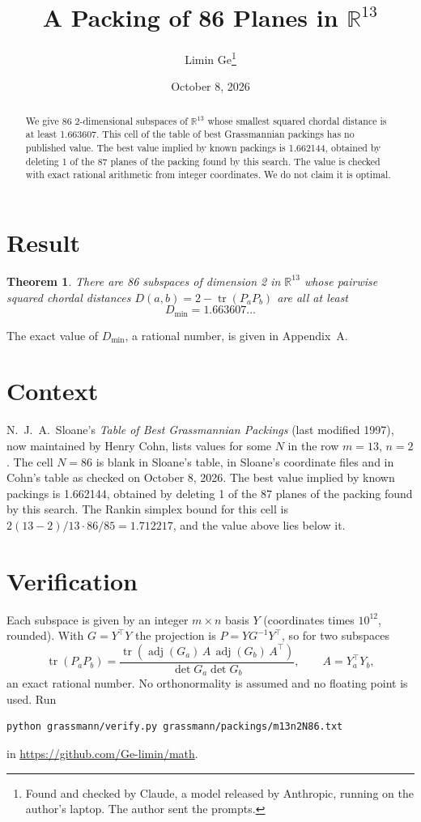 \documentclass[11pt,a4paper]{article}
\title{A Packing of 86 Planes in $\mathbb{R}^{13}$}
\author{Limin Ge\thanks{Found and checked by Claude, a model released by Anthropic, running on the author's laptop. The author sent the prompts.}}
\date{October 8, 2026}
\newtheorem*{theorem}{Theorem}
\begin{document}
\maketitle
\begin{abstract}
We give 86 2-dimensional subspaces of $\mathbb{R}^{13}$ whose smallest squared chordal distance is at least 1.663607. This cell of the table of best Grassmannian packings has no published value. The best value implied by known packings is 1.662144, obtained by deleting 1 of the 87 planes of the packing found by this search. The value is checked with exact rational arithmetic from integer coordinates. We do not claim it is optimal.
\end{abstract}

\section{Result}
\begin{theorem}
There are 86 subspaces of dimension 2 in $\mathbb{R}^{13}$ whose pairwise squared chordal distances $D(a,b) = 2 - \operatorname{tr}(P_aP_b)$ are all at least
\[ D_{\min} = 1.663607\ldots \]
\end{theorem}
The exact value of $D_{\min}$, a rational number, is given in Appendix~A.


\section{Context}
N.~J.~A.~Sloane's \emph{Table of Best Grassmannian Packings} (last modified 1997), now maintained by Henry Cohn, lists values for some $N$ in the row $m=13$, $n=2$. The cell $N=86$ is blank in Sloane's table, in Sloane's coordinate files and in Cohn's table as checked on October 8, 2026. The best value implied by known packings is 1.662144, obtained by deleting 1 of the 87 planes of the packing found by this search. The Rankin simplex bound for this cell is $2(13-2)/13\cdot 86/85 = 1.712217$, and the value above lies below it.


\section{Verification}
Each subspace is given by an integer $m\times n$ basis $Y$ (coordinates times $10^{12}$, rounded). With $G=Y^\top Y$ the projection is $P=YG^{-1}Y^\top$, so for two subspaces
\[ \operatorname{tr}(P_aP_b)=\frac{\operatorname{tr}(\operatorname{adj}(G_a)\,A\,\operatorname{adj}(G_b)\,A^\top)}{\det G_a\det G_b},\qquad A=Y_a^\top Y_b, \]
an exact rational number. No orthonormality is assumed and no floating point is used. Run
\begin{verbatim}
python grassmann/verify.py grassmann/packings/m13n2N86.txt
\end{verbatim}
in \url{https://github.com/Ge-limin/math}.
\end{document}
